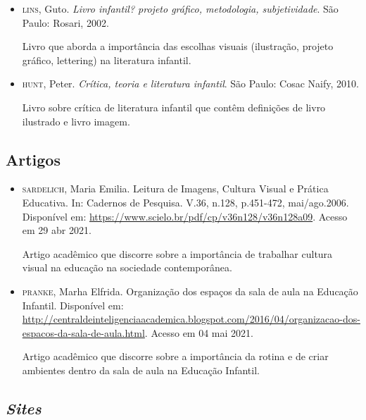 \documentclass[11pt]{extarticle}
\begin{document}
\begin{itemize}
\item \textsc{lins}, Guto. \textit{Livro infantil? projeto gráfico, metodologia, subjetividade}. São Paulo: Rosari, 2002.

Livro que aborda a importância das escolhas visuais (ilustração, projeto gráfico, lettering) na literatura infantil.  

\item \textsc{hunt}, Peter. \textit{Crítica, teoria e literatura infantil}. São Paulo: Cosac Naify, 2010.

Livro sobre crítica de literatura infantil que contêm definições de livro ilustrado e livro imagem. 
\end{itemize}

\subsection{Artigos}

\begin{itemize}
\item \textsc{sardelich}, Maria Emilia. Leitura de Imagens, Cultura Visual e Prática Educativa. 
In: Cadernos de Pesquisa. V.36, n.128, p.451-472, mai/ago.2006. Disponível em: \url{https://www.scielo.br/pdf/cp/v36n128/v36n128a09}. 
Acesso em 29 abr 2021. 

Artigo acadêmico que discorre sobre a importância de trabalhar cultura 
visual na educação na sociedade contemporânea. 

\item \textsc{pranke}, Marha Elfrida. Organização dos espaços da sala de aula na Educação Infantil. Disponível em: \url{http://centraldeinteligenciaacademica.blogspot.com/2016/04/organizacao-dos-espacos-da-sala-de-aula.html}. Acesso em 04 mai 2021. 

Artigo acadêmico que discorre sobre a importância da rotina e de criar ambientes dentro da sala de aula na Educação Infantil.  
\end{itemize}

\subsection{\textit{Sites}}
\end{document}
